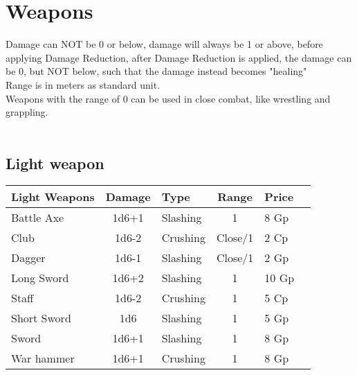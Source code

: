 \chapter{Weapons}
Damage can NOT be 0 or below, damage will always be 1 or above, before applying Damage Reduction, after Damage Reduction is applied, the damage can be 0, but NOT below, such that the damage instead becomes "healing"\\
Range is in meters as standard unit.\\
Weapons with the range of 0 can be used in close combat, like wrestling and grappling.\\\\

\section{Light weapon}
\begin{center}
\begin{tabular}{|l|c|l|c|l|c|}\hline
\rowcolor{gray!50}
    \textbf{Light Weapons}&\textbf{Damage}&\textbf{Type}&\textbf{Range}&\textbf{Price}  \\ \hline
    Battle Axe  & 1d6+1 & Slashing  & 1         & 8 Gp      \\ 
    Club        & 1d6-2 & Crushing  & Close/1   & 2 Cp      \\ 
    Dagger      & 1d6-1 & Slashing  & Close/1   & 2 Gp      \\ 
    Long Sword  & 1d6+2 & Slashing  & 1         & 10 Gp     \\ 
    Staff       & 1d6-2 & Crushing  & 1         & 5 Cp      \\ 
    Short Sword & 1d6   & Slashing  & 1         & 5 Gp      \\
    Sword       & 1d6+1 & Slashing  & 1         & 8 Gp      \\
    War hammer  & 1d6+1 & Crushing  & 1         & 8 Gp      \\
    \hline
\end{tabular}
\end{center}

